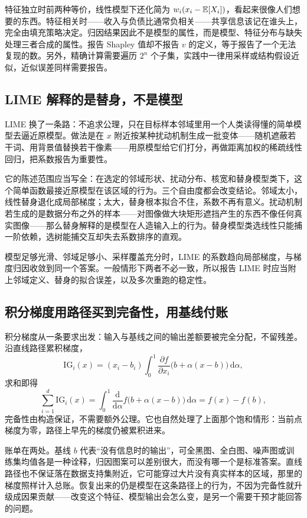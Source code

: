 特征独立时前两种等价，线性模型下还化简为 \(w_i(x_i-\mathbb{E}[X_i])\)，看起来很像人们想要的东西。特征相关时——收入与负债比通常负相关——共享信息该记在谁头上，完全由填充策略决定。归因结果因此不是模型的属性，而是模型、特征分布与缺失处理三者合成的属性。报告 Shapley 值却不报告 \(v\) 的定义，等于报告了一个无法复现的数。另外，精确计算需要遍历 \(2^n\) 个子集，实践中一律用采样或结构假设近似，近似误差同样需要报告。

\subsection{LIME 解释的是替身，不是模型}

LIME 换了一条路：不追求公理，只在目标样本邻域里用一个人类读得懂的简单模型去逼近原模型。做法是在 \(x\) 附近按某种扰动机制生成一批变体——随机遮蔽若干词、用背景值替换若干像素——用原模型给它们打分，再做距离加权的稀疏线性回归，把系数报告为重要性。

它的陈述范围应当写全：在选定的邻域形状、扰动分布、核宽和替身模型类下，这个简单函数最接近原模型在该区域的行为。三个自由度都会改变结论。邻域太小，线性替身退化成局部梯度；太大，替身根本拟合不住，系数不再有意义。扰动机制若生成的是数据分布之外的样本——对图像做大块矩形遮挡产生的东西不像任何真实图像——那么替身解释的是模型在人造输入上的行为。替身模型类选线性只能捕一阶依赖，选树能捕交互却失去系数排序的直观。

模型足够光滑、邻域足够小、采样覆盖充分时，LIME 的系数趋向局部梯度，与梯度归因收敛到同一个答案。一般情形下两者不必一致，所以报告 LIME 时应当附上邻域定义、替身的拟合误差，以及多次重跑的稳定性。

\subsection{积分梯度用路径买到完备性，用基线付账}

积分梯度从一条要求出发：输入与基线之间的输出差额要被完全分配，不留残差。沿直线路径累积梯度，
\[
\mathrm{IG}_i(x)=(x_i-b_i)\int_0^1\frac{\partial f}{\partial x_i}\bigl(b+\alpha(x-b)\bigr)\,\mathrm d\alpha,
\]
求和即得
\[
\sum_{i=1}^d\mathrm{IG}_i(x)=\int_0^1\frac{\mathrm d}{\mathrm d\alpha}f\bigl(b+\alpha(x-b)\bigr)\,\mathrm d\alpha=f(x)-f(b),
\]
完备性由构造保证，不需要额外公理。它也自然处理了上面那个饱和情形：当前点梯度为零，路径上早先的梯度仍被累积进来。

账单在两处。基线 \(b\) 代表``没有信息时的输出''，可全黑图、全白图、噪声图或训练集均值各是一种诠释，归因图案可以差别很大，而没有哪一个是标准答案。直线路径也不保证落在数据支持集附近，它可能穿过大片没有真实样本的区域，那里的梯度照样计入总账。恢复出来的仍是模型在这条路径上的行为，不因为完备性就升级成因果贡献——改变这个特征、模型输出会怎么变，是另一个需要干预才能回答的问题。

